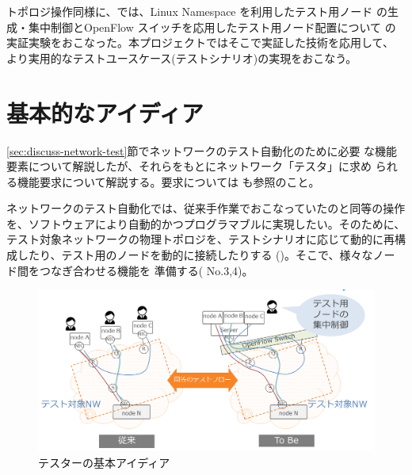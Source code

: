 トポロジ操作同様に、\lopj では、Linux Namespace を利用したテスト用ノード
の生成・集中制御とOpenFlow スイッチを応用したテスト用ノード配置について
の実証実験をおこなった。本プロジェクトではそこで実証した技術を応用して、
より実用的なテストユースケース(テストシナリオ)の実現をおこなう。

 \section{基本的なアイディア}
 \label{sec:basic-tester-idea}



\ref{sec:discuss-network-test}節でネットワークのテスト自動化のために必要
な機能要素について解説したが、それらをもとにネットワーク「テスタ」に求め
られる機能要求について解説する。要求については \lopjtech も参照のこと。

ネットワークのテスト自動化では、従来手作業でおこなっていたのと同等の操作
を、ソフトウェアにより自動的かつプログラマブルに実現したい。そのために、
テスト対象ネットワークの物理トポロジを、テストシナリオに応じて動的に再構
成したり、テスト用のノードを動的に接続したりする
()。そこで、様々なノード間をつなぎ合わせる機能を
準備する( No.3,4)。

\begin{figure}[h]
 \centering
 \includegraphics[scale=0.5]{img/basic-idea.png}
 \caption{テスターの基本アイディア}
 \label{fig:basic-idea}
\end{figure}

